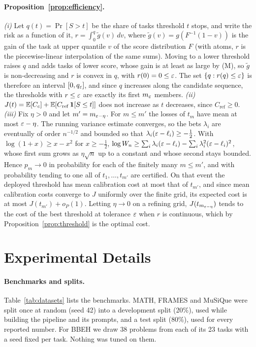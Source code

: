 \paragraph{Proposition~\ref{prop:efficiency}.} \emph{(i)} Let $q(t) = \Pr[S > t]$ be the share of
tasks threshold $t$ stops, and write the risk as a function of it,
$r = \int_0^{q} \tilde g(v)\,dv$, where $\tilde g(v) = g(F^{-1}(1 - v))$ is the gain of the task at
upper quantile $v$ of the score distribution $F$ (with atoms, $r$ is the piecewise-linear
interpolation of the same sums). Moving to a lower threshold raises $q$ and adds tasks of lower
score, whose gain is at least as large by (M), so $\tilde g$ is non-decreasing and $r$ is convex in
$q$, with $r(0) = 0 \le \varepsilon$. The set $\{q : r(q) \le \varepsilon\}$ is therefore an interval
$[0, q_\varepsilon]$, and since $q$ increases along the candidate sequence, the thresholds with
$r \le \varepsilon$ are exactly its first $m_\varepsilon$ members. \emph{(ii)}
$J(t) = \mathbb{E}[C_c] + \mathbb{E}[C_{\mathrm{ref}}\,\mathbf{1}[S \le t]]$ does not increase as $t$ decreases, since
$C_{\mathrm{ref}} \ge 0$. \emph{(iii)} Fix $\eta > 0$ and let $m' = m_{\varepsilon - \eta}$. For $m \le m'$
the losses of $t_m$ have mean at most $\varepsilon - \eta$. The running variance estimate converges, so
the bets $\lambda_i$ are eventually of order $n^{-1/2}$ and bounded so that
$\lambda_i(\varepsilon - \ell_i) \ge -\tfrac12$. With $\log(1 + x) \ge x - x^2$ for $x \ge -\tfrac12$,
$\log W_n \ge \sum_i \lambda_i(\varepsilon - \ell_i) - \sum_i \lambda_i^2(\varepsilon - \ell_i)^2$, whose first sum
grows as $\eta\sqrt{n}$ up to a constant and whose second stays bounded. Hence $p_m \to 0$ in
probability for each of the finitely many $m \le m'$, and with probability tending to one all of
$t_1, \dots, t_{m'}$ are certified. On that event the deployed threshold has mean calibration cost at
most that of $t_{m'}$, and since mean calibration costs converge to $J$ uniformly over the finite
grid, its expected cost is at most $J(t_{m'}) + o_P(1)$. Letting $\eta \to 0$ on a refining grid,
$J(t_{m_{\varepsilon - \eta}})$ tends to the cost of the best threshold at tolerance $\varepsilon$ when $r$ is
continuous, which by Proposition~\ref{prop:threshold} is the optimal cost.

\section{Experimental Details}
\label{app:details}

\paragraph{Benchmarks and splits.} Table~\ref{tab:datasets} lists the benchmarks. MATH, FRAMES and MuSiQue
were split once at random (seed 42) into a development split (20\%), used while building the pipeline and its
prompts, and a test split (80\%), used for every reported number. For BBEH \citep{kazemi2025bbeh} we draw 38
problems from each of its 23 tasks with a seed fixed per task. Nothing was tuned on them.

